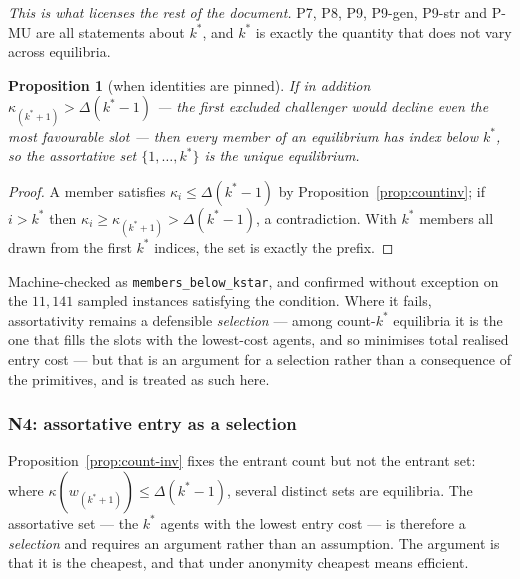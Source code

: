 \documentclass[11pt]{article}
\newtheorem{proposition}{Proposition}
\begin{document}
\emph{This is what licenses the rest of the document.} P7, P8, P9, P9-gen,
P9-str and P-MU are all statements about $k^*$, and $k^*$ is exactly the
quantity that does not vary across equilibria.

\begin{proposition}[when identities are pinned]
\label{prop:idunique}
If in addition $\kappa_{(k^*+1)}>\Delta(k^*-1)$ --- the first excluded
challenger would decline even the most favourable slot --- then every member of
an equilibrium has index below $k^*$, so the assortative set
$\{1,\dots,k^*\}$ is the unique equilibrium.
\end{proposition}
\begin{proof}
A member satisfies $\kappa_i\le\Delta(k^*-1)$ by
Proposition~\ref{prop:countinv}; if $i>k^*$ then
$\kappa_i\ge\kappa_{(k^*+1)}>\Delta(k^*-1)$, a contradiction. With $k^*$
members all drawn from the first $k^*$ indices, the set is exactly the prefix.
\end{proof}

Machine-checked as \texttt{members\_below\_kstar}, and confirmed without
exception on the $11{,}141$ sampled instances satisfying the condition. Where
it fails, assortativity remains a defensible \emph{selection} --- among
count-$k^*$ equilibria it is the one that fills the slots with the lowest-cost
agents, and so minimises total realised entry cost --- but that is an argument
for a selection rather than a consequence of the primitives, and is treated as
such here.

\subsubsection{N4: assortative entry as a selection}
\label{prop:assortative}

Proposition~\ref{prop:count-inv} fixes the entrant count but not the entrant
set: where $\kappa(w_{(k^*+1)})\le\Delta(k^*-1)$, several distinct sets are
equilibria. The assortative set --- the $k^*$ agents with the lowest entry
cost --- is therefore a \emph{selection} and requires an argument rather than
an assumption. The argument is that it is the cheapest, and that under
anonymity cheapest means efficient.
\end{document}
